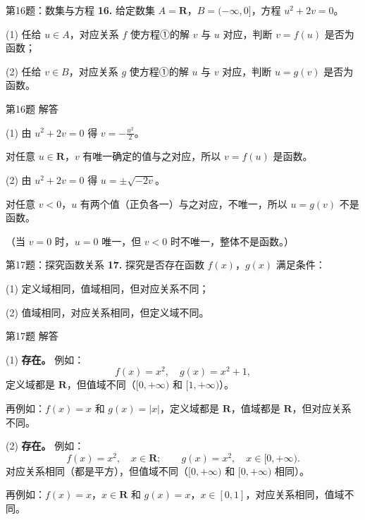\documentclass[10pt,aspectratio=169,serif]{beamer}
\begin{document}
\begin{frame}[t]{第16题：数集与方程}
\textbf{16.} 给定数集 $A=\mathbf{R}$，$B=(-\infty,0]$，方程 $u^2+2v=0$。

\vspace{0.5em}
(1) 任给 $u\in A$，对应关系 $f$ 使方程①的解 $v$ 与 $u$ 对应，判断 $v=f(u)$ 是否为函数；

\vspace{0.5em}
(2) 任给 $v\in B$，对应关系 $g$ 使方程①的解 $u$ 与 $v$ 对应，判断 $u=g(v)$ 是否为函数。
\end{frame}

\begin{frame}[t]{第16题 解答}
\begin{tcolorbox}[colback=orange!10,colframe=orange,title=\textbf{解}]
(1) 由 $u^2+2v=0$ 得 $\displaystyle v=-\frac{u^2}{2}$。

\vspace{0.3em}
对任意 $u\in\mathbf{R}$，$v$ 有唯一确定的值与之对应，所以 $v=f(u)$ \alert{是}函数。

\vspace{1em}
(2) 由 $u^2+2v=0$ 得 $u=\pm\sqrt{-2v}$。

\vspace{0.3em}
对任意 $v<0$，$u$ 有两个值（正负各一）与之对应，不唯一，所以 $u=g(v)$ \alert{不是}函数。

\vspace{0.3em}
（当 $v=0$ 时，$u=0$ 唯一，但 $v<0$ 时不唯一，整体不是函数。）
\end{tcolorbox}
\end{frame}

\begin{frame}[t]{第17题：探究函数关系}
\textbf{17.} 探究是否存在函数 $f(x)$，$g(x)$ 满足条件：

\vspace{0.5em}
(1) 定义域相同，值域相同，但对应关系不同；

\vspace{0.5em}
(2) 值域相同，对应关系相同，但定义域不同。
\end{frame}

\begin{frame}[t]{第17题 解答}
\begin{tcolorbox}[colback=orange!10,colframe=orange,title=\textbf{解}]
(1) \textbf{存在。} 例如：
\[
f(x)=x^2,\quad g(x)=x^2+1,
\]
定义域都是 $\mathbf{R}$，但值域不同（$[0,+\infty)$ 和 $[1,+\infty)$）。

\vspace{0.5em}
再例如：$f(x)=x$ 和 $g(x)=|x|$，定义域都是 $\mathbf{R}$，值域都是 $\mathbf{R}$，但对应关系不同。

\vspace{1em}
(2) \textbf{存在。} 例如：
\[
f(x)=x^2,\quad x\in\mathbf{R}; \qquad g(x)=x^2,\quad x\in[0,+\infty).
\]
对应关系相同（都是平方），但值域不同（$[0,+\infty)$ 和 $[0,+\infty)$ 相同）。

\vspace{0.3em}
再例如：$f(x)=x$，$x\in\mathbf{R}$ 和 $g(x)=x$，$x\in[0,1]$，对应关系相同，值域不同。
\end{tcolorbox}
\end{frame}
\end{document}
